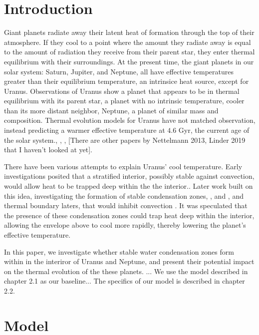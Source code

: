\documentclass[11pt]{ucscthesisbs}
\begin{document}
\chapter{Introduction}
Giant planets radiate away their latent heat of formation through the top of their atmosphere. If they cool to a point where the amount they radiate away is equal to the amount of radiation they receive from their parent star, they enter thermal equilibrium with their surroundings. At the present time, the giant planets in our solar system: Saturn, Jupiter, and Neptune, all have effective temperatures greater than their equilibrium temperature, an intrinsice heat source, except for Uranus. Observations of Uranus show a planet that appears to be in thermal equilibrium with its parent star, a planet with no intrinsic temperature, cooler than its more distant neighbor, Neptune, a planet of similar mass and composition. Thermal evolution models for Uranus have not matched observation, instead predicting a warmer effective temperature at $4.6$ Gyr, the current age of the solar system.\citep{fortney_2011}, \citep{podolak_1991}, \citep{hubbard_1995}, \citep{scheibe_2019} [There are other papers by Nettelmann 2013, Linder 2019 that I haven't looked at yet]. 

There have been various attempts to explain Uranus' cool temperature. Early investigations posited that a stratified interior, possibly stable against convection, would allow heat to be trapped deep within the the interior.\citep{podolak_1991}. Later work built on this idea, investigating the formation of stable condensation zones\citep{friedson_2017}, \citep{leconte_2017}, and \citep{guillot_1995}, and thermal boundary laters\citep{nettelmann_2016}, that would inhibit convection . It was speculated that the presence of these condensation zones could trap heat deep within the interior, allowing the envelope above to cool more rapidly, thereby lowering the planet's effective temperature.

In this paper, we investigate whether stable water condensation zones form within in the interiror of Uranus and Neptune, and present their potential impact on the thermal evolution of the these planets.
...
We use the model described in chapter 2.1 as our baseline...
The specifics of our model is described in chapter 2.2.

\chapter{Model}
\end{document}

